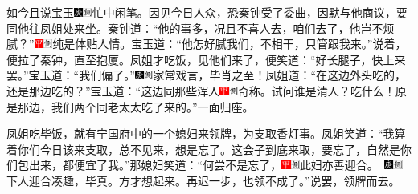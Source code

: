 如今且说宝玉{\includegraphics[width=3mm]{../Images/00004}\includegraphics[width=3mm]{../Images/00011}\footnotesize \kaishu 忙中闲笔。}因见今日人众，恐秦钟受了委曲，因默与他商议，要同他往凤姐处来坐。秦钟道：“他的事多，况且不喜人去，咱们去了，他岂不烦腻？”{\includegraphics[width=3mm]{../Images/00002}\includegraphics[width=3mm]{../Images/00011}\footnotesize \kaishu 纯是体贴人情。}宝玉道：“他怎好腻我们，不相干，只管跟我来。”说着，便拉了秦钟，直至抱厦。凤姐才吃饭，见他们来了，便笑道：“好长腿子，快上来罢。”宝玉道：“我们偏了。”{\includegraphics[width=3mm]{../Images/00004}\includegraphics[width=3mm]{../Images/00011}\footnotesize \kaishu 家常戏言，毕肖之至！}凤姐道：“在这边外头吃的，还是那边吃的？”宝玉道：“这边同那些浑人{\includegraphics[width=3mm]{../Images/00002}\includegraphics[width=3mm]{../Images/00011}\footnotesize \kaishu 奇称。试问谁是清人？}吃什么！原是那边，我们两个同老太太吃了来的。”一面归座。

凤姐吃毕饭，就有宁国府中的一个媳妇来领牌，为支取香灯事。凤姐笑道：“我算着你们今日该来支取，总不见来，想是忘了。这会子到底来取，要忘了，自然是你们包出来，都便宜了我。”那媳妇笑道：“何尝不是忘了，{\includegraphics[width=3mm]{../Images/00002}\includegraphics[width=3mm]{../Images/00011}\footnotesize \kaishu 此妇亦善迎合。　\includegraphics[width=3mm]{../Images/00004}\includegraphics[width=3mm]{../Images/00011}\footnotesize \kaishu 下人迎合凑趣，毕真。}方才想起来。再迟一步，也领不成了。”说罢，领牌而去。

